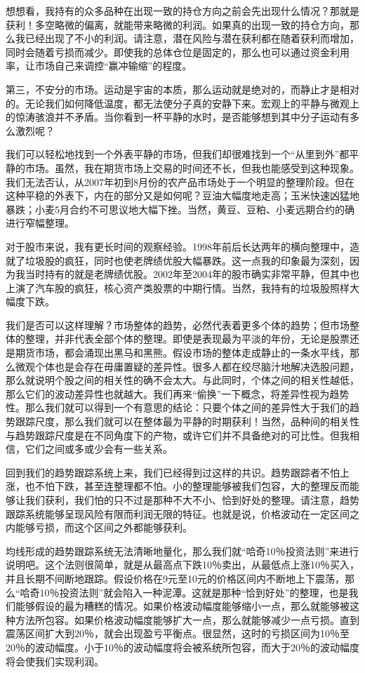 想想看，我持有的众多品种在出现一致的持仓方向之前会先出现什么情况？那就是获利！多空略微的偏离，就能带来略微的利润。如果真的出现一致的持仓方向，那么我已经出现了不小的利润。请注意，潜在风险与潜在获利都在随着获利而增加，同时会随着亏损而减少。即使我的总体仓位是固定的，那么也可以通过资金利用率，让市场自己来调控“赢冲输缩”的程度。

第三，不安分的市场。运动是宇宙的本质，那么运动就是绝对的，而静止才是相对的。无论我们如何降低温度，都无法使分子真的安静下来。宏观上的平静与微观上的惊涛骇浪并不矛盾。当你看到一杯平静的水时，是否能够想到其中分子运动有多么激烈呢？

我们可以轻松地找到一个外表平静的市场，但我们却很难找到一个“从里到外”都平静的市场。虽然，我在期货市场上交易的时间还不长，但我也能感受到这种现象。我们无法否认，从2007年初到8月份的农产品市场处于一个明显的整理阶段。但在这种平稳的外表下，内在的部分又是如何呢？豆油大幅度地走高；玉米快速凶猛地暴跌；小麦5月合约不可思议地大幅下挫。当然，黄豆、豆粕、小麦远期合约的确进行窄幅整理。

对于股市来说，我有更长时间的观察经验。1998年前后长达两年的横向整理中，造就了垃圾股的疯狂，同时也使老牌绩优股大幅暴跌。这一点我的印象最为深刻，因为我当时持有的就是老牌绩优股。2002年至2004年的股市确实非常平静，但其中也上演了汽车股的疯狂，核心资产类股票的中期行情。当然，我持有的垃圾股照样大幅度下跌。

我们是否可以这样理解？市场整体的趋势，必然代表着更多个体的趋势；但市场整体的整理，并非代表全部个体的整理。即使是表现最为平淡的年份，无论是股票还是期货市场，都会涌现出黑马和黑熊。假设市场的整体走成静止的一条水平线，那么微观个体也是会存在毋庸置疑的差异性。很多人都在绞尽脑汁地解决选股问题，那么就说明个股之间的相关性的确不会太大。与此同时，个体之间的相关性越低，那么它们的波动差异性也就越大。我们再来“偷换”一下概念，将差异性视为趋势性。那么我们就可以得到一个有意思的结论：只要个体之间的差异性大于我们的趋势跟踪尺度，那么我们就可以在整体最为平静的时期获利！当然，品种间的相关性与趋势跟踪尺度是在不同角度下的产物，或许它们并不具备绝对的可比性。但我相信，它们之间或多或少会有一些关系。

回到我们的趋势跟踪系统上来，我们已经得到过这样的共识。趋势跟踪者不怕上涨，也不怕下跌，甚至连整理都不怕。小的整理能够被我们包容，大的整理反而能够让我们获利，我们怕的只不过是那种不大不小、恰到好处的整理。请注意，趋势跟踪系统能够呈现风险有限而利润无限的特征。也就是说，价格波动在一定区间之内能够亏损，而这个区间之外都能够获利。

均线形成的趋势跟踪系统无法清晰地量化，那么我们就“哈奇10％投资法则”来进行说明吧。这个法则很简单，就是从最高点下跌10％卖出，从最低点上涨10％买入，并且长期不间断地跟踪。假设价格在9元至10元的价格区间内不断地上下震荡，那么“哈奇10％投资法则”就会陷入一种泥潭。这就是那种“恰到好处”的整理，也是我们能够假设的最为糟糕的情况。如果价格波动幅度能够缩小一点，那么就能够被这种方法所包容。如果价格波动幅度能够扩大一点，那么就能够减少一点亏损。直到震荡区间扩大到20％，就会出现盈亏平衡点。很显然，这时的亏损区间为10％至20％的波动幅度。小于10％的波动幅度将会被系统所包容，而大于20％的波动幅度将会使我们实现利润。

